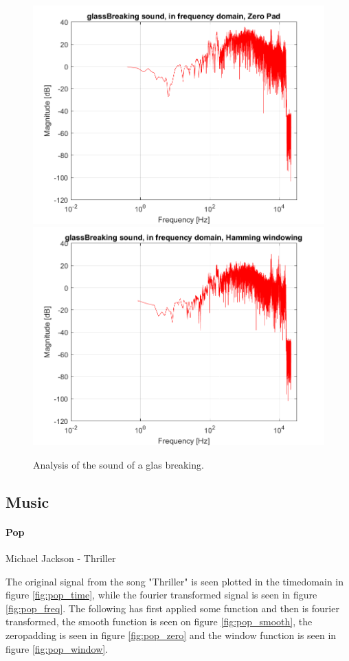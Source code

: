 \begin{figure}[htb!]
	{\includegraphics[width=0.45\linewidth]{code/glassBreaking_figure4.png}}
	{\includegraphics[width=0.45\linewidth]{code/glassBreaking_figure5.png}}
	\caption{Analysis of the sound of a glas breaking.}\label{fig:glassBreaking}
\end{figure}


\subsection{Music}

\paragraph{Pop}
Michael Jackson - Thriller

The original signal from the song "Thriller" is seen plotted in the timedomain in figure \ref{fig:pop_time}, while the fourier transformed signal is seen in figure \ref{fig:pop_freq}. The following has first applied some function and then is fourier transformed, the smooth function is seen on figure \ref{fig:pop_smooth}, the zeropadding is seen in figure \ref{fig:pop_zero} and the window function is seen in figure \ref{fig:pop_window}.


